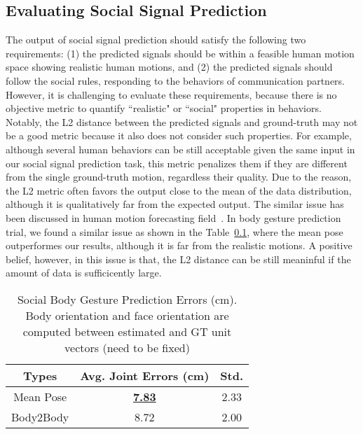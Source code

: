 
\subsection{Evaluating Social Signal Prediction}
The output of social signal prediction should satisfy the following two requirements: (1) the predicted signals should be within a feasible human motion space showing realistic human motions, and (2) the predicted signals should follow the social rules, responding to the behaviors of communication partners. However, it is challenging to evaluate these requirements, because there is no objective metric to quantify ``realistic" or ``social" properties in behaviors. Notably, the L2 distance between the predicted signals and ground-truth may not be a good metric because it also does not consider such properties. For example, although several human behaviors can be still acceptable given the same input in our social signal prediction task, this metric penalizes them if they are different from the single ground-truth motion, regardless their quality. Due to the reason, the L2 metric often favors the output close to the mean of the data distribution, although it is qualitatively far from the expected output. The similar issue has been discussed in human motion forecasting field~\cite{mnih2012conditional, Fragkiadaki_2015_ICCV, jain2016structural, zhou2018autoconditioned}. In body gesture prediction trial, we found a similar issue as shown in the Table~\ref{}, where the mean pose outperformes our results, although it is far from the realistic motions.  A positive belief, however, in this issue is that, the L2 distance can be still meaninful if the amount of data is sufficicently large. 


\begin{table}[t]
	\centering
	\begin{tabular}{c| c| c}
		
		\hline
		Types & Avg. Joint Errors (cm) & Std.\\
		\hline
		Mean Pose & \underline {\textbf{7.83}} & 2.33\\
		\hline
		Body2Body & 8.72 & 2.00\\
		\hline
	\end{tabular}
	\caption{Social Body Gesture Prediction Errors (cm). Body orientation and face orientation are computed between estimated and GT unit vectors (need to be fixed) \label{table:predBody_errors}}
\end{table}

